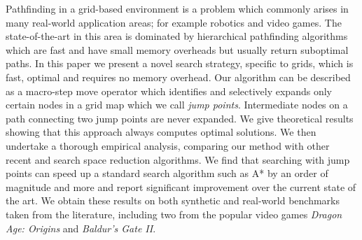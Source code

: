 Pathfinding in a grid-based environment is a problem which commonly arises in
many real-world application areas; for example robotics and video games.  The
state-of-the-art in this area is dominated by hierarchical pathfinding
algorithms which are fast and have small memory overheads but usually return
suboptimal paths.  
In this paper we present a novel search strategy, specific to grids, which is
fast, optimal and requires no memory overhead. Our algorithm can be described as
a macro-step move operator which identifies and selectively expands only certain 
nodes in a grid map which we call \emph{jump points}.
Intermediate nodes on a path connecting two jump points are never expanded.
We give theoretical results showing that this approach always computes optimal
solutions. We then undertake a thorough empirical analysis, comparing our method
with other recent and search space reduction algorithms.
We find that searching with jump points can speed up a standard search algorithm
such as A* by an order of magnitude and more and report significant improvement 
over the current state of the art.
We obtain these results on both synthetic and real-world
benchmarks taken from the literature, including two from the popular video games
\emph{Dragon Age: Origins} and \emph{Baldur's Gate II}.


